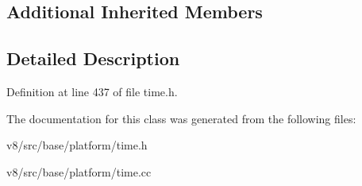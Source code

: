\subsection*{Additional Inherited Members}


\subsection{Detailed Description}


Definition at line 437 of file time.\+h.



The documentation for this class was generated from the following files\+:\begin{DoxyCompactItemize}
\item 
v8/src/base/platform/time.\+h\item 
v8/src/base/platform/time.\+cc\end{DoxyCompactItemize}
